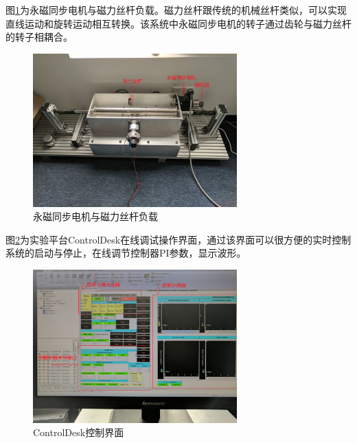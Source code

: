 图\ref{fig:motor}为永磁同步电机与磁力丝杆负载。磁力丝杆跟传统的机械丝杆类似，可以实现直线运动和旋转运动相互转换。该系统中永磁同步电机的转子通过齿轮与磁力丝杆的转子相耦合。
\begin{figure}[H]
	\centering
	\includegraphics[width=0.7\textwidth]{figs/motor.jpg}
	\caption{永磁同步电机与磁力丝杆负载}
	\label{fig:motor}
\end{figure}
图\ref{fig:ControlDesk}为实验平台ControlDesk在线调试操作界面，通过该界面可以很方便的实时控制系统的启动与停止，在线调节控制器PI参数，显示波形。
\begin{figure}[H]
	\centering
	\includegraphics[width=0.7\textwidth]{figs/ControlDesk.jpg}
	\caption{ControlDesk控制界面}
	\label{fig:ControlDesk}
\end{figure}
